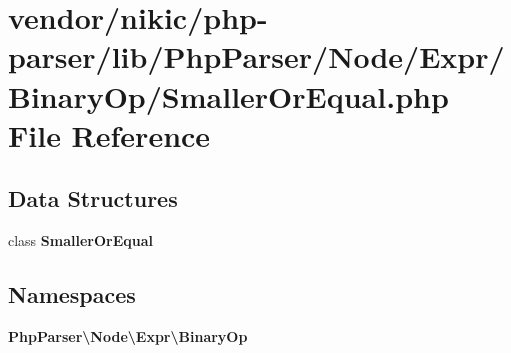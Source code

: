 \section{vendor/nikic/php-\/parser/lib/\+Php\+Parser/\+Node/\+Expr/\+Binary\+Op/\+Smaller\+Or\+Equal.php File Reference}
\label{_smaller_or_equal_8php}
\subsection*{Data Structures}
\begin{DoxyCompactItemize}
\item 
class {\bf Smaller\+Or\+Equal}
\end{DoxyCompactItemize}
\subsection*{Namespaces}
\begin{DoxyCompactItemize}
\item 
 {\bf Php\+Parser\textbackslash{}\+Node\textbackslash{}\+Expr\textbackslash{}\+Binary\+Op}
\end{DoxyCompactItemize}
